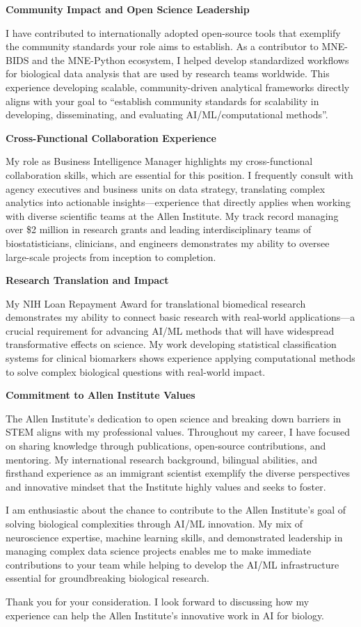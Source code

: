 \documentclass[10.5pt, letterpaper]{russell}
\begin{document}
\begin{cvletter}
\textbf{Community Impact and Open Science Leadership}

I have contributed to internationally adopted open-source tools that exemplify the community standards your role aims to establish. As a contributor to MNE-BIDS and the MNE-Python ecosystem, I helped develop standardized workflows for biological data analysis that are used by research teams worldwide. This experience developing scalable, community-driven analytical frameworks directly aligns with your goal to ``establish community standards for scalability in developing, disseminating, and evaluating AI/ML/computational methods''.

\textbf{Cross-Functional Collaboration Experience}

My role as Business Intelligence Manager highlights my cross-functional collaboration skills, which are essential for this position. I frequently consult with agency executives and business units on data strategy, translating complex analytics into actionable insights—experience that directly applies when working with diverse scientific teams at the Allen Institute. My track record managing over \$2 million in research grants and leading interdisciplinary teams of biostatisticians, clinicians, and engineers demonstrates my ability to oversee large-scale projects from inception to completion.

\textbf{Research Translation and Impact}

My NIH Loan Repayment Award for translational biomedical research demonstrates my ability to connect basic research with real-world applications—a crucial requirement for advancing AI/ML methods that will have widespread transformative effects on science. My work developing statistical classification systems for clinical biomarkers shows experience applying computational methods to solve complex biological questions with real-world impact.

\textbf{Commitment to Allen Institute Values}

The Allen Institute's dedication to open science and breaking down barriers in STEM aligns with my professional values. Throughout my career, I have focused on sharing knowledge through publications, open-source contributions, and mentoring. My international research background, bilingual abilities, and firsthand experience as an immigrant scientist exemplify the diverse perspectives and innovative mindset that the Institute highly values and seeks to foster.

I am enthusiastic about the chance to contribute to the Allen Institute's goal of solving biological complexities through AI/ML innovation. My mix of neuroscience expertise, machine learning skills, and demonstrated leadership in managing complex data science projects enables me to make immediate contributions to your team while helping to develop the AI/ML infrastructure essential for groundbreaking biological research.

Thank you for your consideration. I look forward to discussing how my experience can help the Allen Institute's innovative work in AI for biology.

\end{cvletter}

\makeletterclosing
\end{document}
